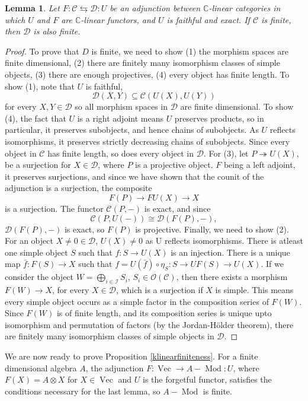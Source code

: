 \documentclass[a4paper, 10pt]{book}
\newtheorem{Lem}[theorem]{Lemma}
\theoremstyle{definition}
\numberwithin{equation}{chapter}
\newcommand\Vect{\operatorname{Vec}}
\newcommand\Mod{\operatorname{Mod}}
\newcommand\kk{\mathbb C}
\newcommand\C{\mathcal C}
\newcommand\OO{\mathcal O}
\newcommand\D{\mathcal D}
\newcommand \I{\mathcal I }
\begin{document}
\begin{Lem}
Let $F:\C \leftrightarrows  \D : U$ be an adjunction between $\kk$-linear categories in which $U$ and $F$ are $\kk$-linear functors, and $U$ is faithful and exact. If $\C$ is finite, then $\D$ is also finite.
\end{Lem}
\begin{proof}
To prove that $D$ is finite, we need to show (1) the morphism spaces are finite dimensional, (2) there are finitely many isomorphism classes of simple objects, (3) there are enough projectives, (4) every object has finite length.
To show (1), note that $U$ is faithful, \begin{equation*}
	\D(X, Y) \subseteq \C(U(X), U(Y))
\end{equation*} for every $X,Y \in \D$ so all morphism spaces in $\D$ are finite dimensional. To show (4), the fact that $U$ is a right adjoint means $U$ preserves products, so in particular, it preserves subobjects, and hence chains of subobjects. As $U$ reflects isomorphisms, it preserves strictly decreasing chains of subobjects. Since every object in $\C$ has finite length, so does every object in $\D$. For (3), let $P \twoheadrightarrow U(X)$, be a surjection for $X\in \D$, where $P$ is a projective object. $F$ being a left adjoint, it preserves surjections, and since we have shown that the counit of the adjunction is a surjection, the composite \begin{equation*}
	F(P) \rightarrow FU(X)\rightarrow X
\end{equation*}
is a surjection. The functor $\C(P, -)$ is exact, and since \begin{equation*}
	\C(P, U(-)) \cong \D(F(P), -), 
\end{equation*}
$\D(F(P), -)$ is exact, so $F(P)$ is projective. Finally, we need to show (2). For an object $X\neq 0 \in \D$, $U(X)\neq 0$ as U reflects isomorphisms. There is atleast one simple object $S$ such that $f:S\rightarrow U(X)$ is an injection. There is a unique map $\bar{f}:F(S) \rightarrow X$ such that $f = U(\bar{f})\circ\eta_S: S\rightarrow UF(S) \rightarrow U(X)$. If we consider the object $W= \bigoplus_{i\in \I} S_i$, $ S_i\in \OO(\C)$, then there exists a morphism $F(W) \rightarrow X$, for every $X\in \D$, which is a surjection if $X$ is simple. This means every simple object occurs as a simple factor in the composition series of $F(W)$. Since $F(W)$ is of finite length, and its composition series is unique upto isomorphism and permutation of factors (by the Jordan-H\"older theorem), there are finitely many isomorphism classes of simple objects in $\D$.      
\end{proof}
We are now ready to prove Proposition \ref{klinearfiniteness}. For a finite dimensional algebra $A$, the adjunction $F:\Vect \rightarrow A-\Mod: U$, where $F(X) = A\otimes X$ for $X\in \Vect$ and $U$ is the forgetful functor, satisfies the conditions necessary for the last lemma, so $A-\Mod$ is finite.
\end{document}
